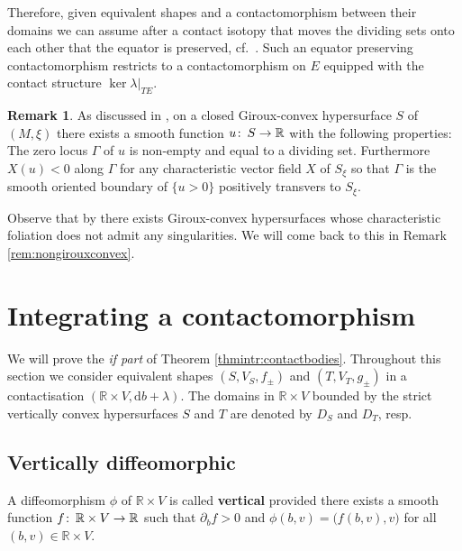 \documentclass{amsart}
\theoremstyle{definition}
\newtheorem{rem}[prop]{Remark}
\def\co{\colon\thinspace}
\newcommand{\rmd}{\mathrm d}
\newcommand{\R}{\mathbb R}
\newcommand{\ra}{\rightarrow}
\begin{document}
Therefore,
given equivalent shapes
and a contactomorphism between their domains
we can assume after a contact isotopy
that moves the dividing sets onto each other
that the equator is preserved,
cf.\ \cite[Theorem 4.8.5(b)]{gei08}.
Such an equator preserving contactomorphism
restricts to a contactomorphism on $E$
equipped with the contact structure $\ker\lambda|_{TE}$.


\begin{rem}
\label{rem:divset}
 As discussed in \cite[Section 4.8]{gei08},
 on a closed Giroux-convex hypersurface $S$
 of $(M,\xi)$ there exists a smooth function $u\co S\ra\R$
 with the following properties:
 The zero locus $\Gamma$ of $u$ is non-empty
 and equal to a dividing set.
 Furthermore
 $X(u)<0$ along $\Gamma$
 for any characteristic vector field $X$ of $S_{\xi}$
 so that $\Gamma$ is the smooth oriented boundary
 of $\{u>0\}$ positively transvers to $S_{\xi}$.
 
  Observe that by \cite[Example 4.8.10]{gei08}
  there exists Giroux-convex hypersurfaces
  whose characteristic foliation
  does not admit any singularities.
 We will come back to this in
 Remark \ref{rem:nongirouxconvex}.
\end{rem}




\section{Integrating a contactomorphism\label{sec:intgratcont}}


We will prove the {\it if part} of Theorem \ref{thmintr:contactbodies}.
Throughout this section
we consider equivalent shapes
$(S,V_S,f_{\pm})$ and $(T,V_T,g_{\pm})$
in a contactisation $(\R\times V,\rmd b+\lambda)$.
The domains in $\R\times V$
bounded by the strict vertically convex hypersurfaces $S$ and $T$
are denoted by $D_S$ and $D_T$, resp.



\subsection{Vertically diffeomorphic\label{subsec:vertdiff}}


A diffeomorphism $\phi$ of $\R\times V$ is called {\bf vertical}
provided there exists a smooth function $f\co\R\times V\ra\R$
such that $\partial_bf>0$ and
$\phi(b,v)=\big(f(b,v),v\big)$ for all $(b,v)\in\R\times V$.
\end{document}
